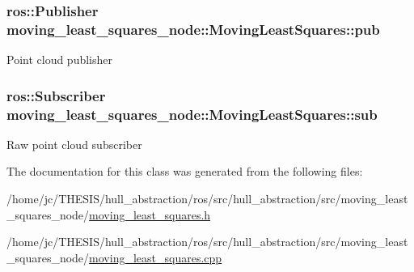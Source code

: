 \subsubsection[{\texorpdfstring{pub}{pub}}]{\setlength{\rightskip}{0pt plus 5cm}ros\+::\+Publisher moving\+\_\+least\+\_\+squares\+\_\+node\+::\+Moving\+Least\+Squares\+::pub\hspace{0.3cm}{\ttfamily [private]}}\hypertarget{classmoving__least__squares__node_1_1_moving_least_squares_a575c8db3fd78dc6e4bfd432d2d75916c}{}\label{classmoving__least__squares__node_1_1_moving_least_squares_a575c8db3fd78dc6e4bfd432d2d75916c}
Point cloud publisher 
\subsubsection[{\texorpdfstring{sub}{sub}}]{\setlength{\rightskip}{0pt plus 5cm}ros\+::\+Subscriber moving\+\_\+least\+\_\+squares\+\_\+node\+::\+Moving\+Least\+Squares\+::sub\hspace{0.3cm}{\ttfamily [private]}}\hypertarget{classmoving__least__squares__node_1_1_moving_least_squares_a3afb046b92a8d8df03d06542ba9fc9bd}{}\label{classmoving__least__squares__node_1_1_moving_least_squares_a3afb046b92a8d8df03d06542ba9fc9bd}
Raw point cloud subscriber 

The documentation for this class was generated from the following files\+:\begin{DoxyCompactItemize}
\item 
/home/jc/\+T\+H\+E\+S\+I\+S/hull\+\_\+abstraction/ros/src/hull\+\_\+abstraction/src/moving\+\_\+least\+\_\+squares\+\_\+node/\hyperlink{moving__least__squares_8h}{moving\+\_\+least\+\_\+squares.\+h}\item 
/home/jc/\+T\+H\+E\+S\+I\+S/hull\+\_\+abstraction/ros/src/hull\+\_\+abstraction/src/moving\+\_\+least\+\_\+squares\+\_\+node/\hyperlink{moving__least__squares_8cpp}{moving\+\_\+least\+\_\+squares.\+cpp}\end{DoxyCompactItemize}
